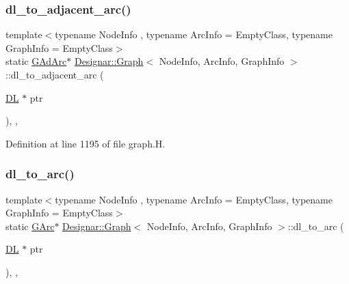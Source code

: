 \mbox{\label{class_designar_1_1_graph_afb508b7f8616948cc46c33deddcfaa4c}} 
\subsubsection{\texorpdfstring{dl\+\_\+to\+\_\+adjacent\+\_\+arc()}{dl\_to\_adjacent\_arc()}}
{\footnotesize\ttfamily template$<$typename Node\+Info , typename Arc\+Info  = Empty\+Class, typename Graph\+Info  = Empty\+Class$>$ \\
static \hyperlink{class_designar_1_1_graph_a7d00558995946c5653522148b54971bc}{G\+Ad\+Arc}$\ast$ \hyperlink{class_designar_1_1_graph}{Designar\+::\+Graph}$<$ Node\+Info, Arc\+Info, Graph\+Info $>$\+::dl\+\_\+to\+\_\+adjacent\+\_\+arc (\begin{DoxyParamCaption}\item[{\hyperlink{class_designar_1_1_d_l}{DL} $\ast$}]{ptr }\end{DoxyParamCaption})\hspace{0.3cm}{\ttfamily [inline]}, {\ttfamily [static]}, {\ttfamily [protected]}}



Definition at line 1195 of file graph.\+H.

\mbox{\label{class_designar_1_1_graph_a543b3279c059a0ee596a56a704ab7825}} 
\subsubsection{\texorpdfstring{dl\+\_\+to\+\_\+arc()}{dl\_to\_arc()}}
{\footnotesize\ttfamily template$<$typename Node\+Info , typename Arc\+Info  = Empty\+Class, typename Graph\+Info  = Empty\+Class$>$ \\
static \hyperlink{class_designar_1_1_graph_a5ad9e18b71899c2d4979426e367e5573}{G\+Arc}$\ast$ \hyperlink{class_designar_1_1_graph}{Designar\+::\+Graph}$<$ Node\+Info, Arc\+Info, Graph\+Info $>$\+::dl\+\_\+to\+\_\+arc (\begin{DoxyParamCaption}\item[{\hyperlink{class_designar_1_1_d_l}{DL} $\ast$}]{ptr }\end{DoxyParamCaption})\hspace{0.3cm}{\ttfamily [inline]}, {\ttfamily [static]}, {\ttfamily [protected]}}



